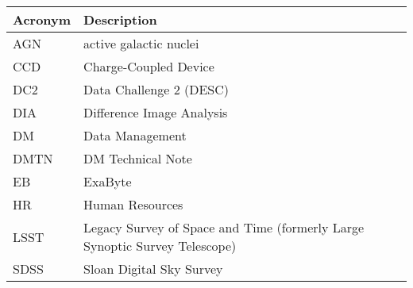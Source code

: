 \addtocounter{table}{-1}
\begin{longtable}{p{}p{}}\hline
\textbf{Acronym} & \textbf{Description}  \\\hline

AGN & active galactic nuclei \\\hline
CCD & Charge-Coupled Device \\\hline
DC2 & Data Challenge 2 (DESC) \\\hline
DIA & Difference Image Analysis \\\hline
DM & Data Management \\\hline
DMTN & DM Technical Note \\\hline
EB & ExaByte \\\hline
HR & Human Resources \\\hline
LSST & Legacy Survey of Space and Time (formerly Large Synoptic Survey Telescope) \\\hline
SDSS & Sloan Digital Sky Survey \\\hline
\end{longtable}
